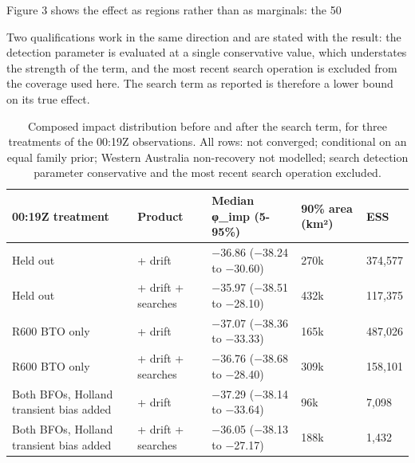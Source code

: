 \documentclass[12pt,a4paper]{article}
\begin{document}

Figure 3 shows the effect as regions rather than as marginals: the 50%

Two qualifications work in the same direction and are stated with the result: the detection parameter is evaluated at a single conservative value, which understates the strength of the term, and the most recent search operation is excluded from the coverage used here. The search term as reported is therefore a lower bound on its true effect.

\begin{table}[htbp]\centering\caption{Composed impact distribution before and after the search term, for three treatments of the 00:19Z observations. All rows: not converged; conditional on an equal family prior; Western Australia non-recovery not modelled; search detection parameter conservative and the most recent search operation excluded.}

\vspace{3pt}\small\begin{tabular}{@{}p{3.9cm}p{3.5cm}p{2.5cm}p{1.9cm}p{2.2cm}@{}}\toprule

00:19Z treatment & Product & Median φ\_imp (5-95\%) & 90\% area (km²) & ESS \\ \midrule

Held out & + drift & −36.86 (−38.24 to −30.60) & 270k & 374,577 \\

Held out & + drift + searches & −35.97 (−38.51 to −28.10) & 432k & 117,375 \\

R600 BTO only & + drift & −37.07 (−38.36 to −33.33) & 165k & 487,026 \\

R600 BTO only & + drift + searches & −36.76 (−38.68 to −28.40) & 309k & 158,101 \\

Both BFOs, Holland transient bias added & + drift & −37.29 (−38.14 to −33.64) & 96k & 7,098 \\

Both BFOs, Holland transient bias added & + drift + searches & −36.05 (−38.13 to −27.17) & 188k & 1,432 \\

\bottomrule\end{tabular}\end{table}
\end{document}
